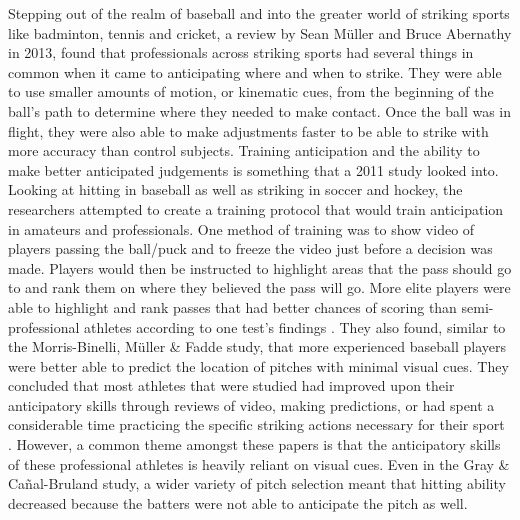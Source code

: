 \documentclass{article}
\begin{document}
\begin{doublespace}
Stepping out of the realm of baseball and into the greater world of striking sports like badminton, tennis and cricket, a review by Sean Müller and Bruce Abernathy in 2013, found that professionals across striking sports had several things in common when it came to anticipating where and when to strike. They were able to use smaller amounts of motion, or kinematic cues, from the beginning of the ball’s path to determine where they needed to make contact. Once the ball was in flight, they were also able to make adjustments faster to be able to strike with more accuracy than control subjects\citep{Muller}. Training anticipation and the ability to make better anticipated judgements is something that a 2011 study looked into. Looking at hitting in baseball as well as striking in soccer and hockey, the researchers attempted to create a training protocol that would train anticipation in amateurs and professionals. One method of training was to show video of players passing the ball/puck and to freeze the video just before a decision was made. Players would then be instructed to highlight areas that the pass should go to and rank them on where they believed the pass will go. More elite players were able to highlight and rank passes that had better chances of scoring than semi-professional athletes according to one test’s findings \citep{Williams}. They also found, similar to the Morris-Binelli, Müller & Fadde study\citep{Morris}, that more experienced baseball players were better able to predict the location of pitches with minimal visual cues. They concluded that most athletes that were studied had improved upon their anticipatory skills through reviews of video, making predictions, or had spent a considerable time practicing the specific striking actions necessary for their sport \citep{Williams}. However, a common theme amongst these papers is that the anticipatory skills of these professional athletes is heavily reliant on visual cues. Even in the Gray & Cañal-Bruland study\citep{Gray}, a wider variety of pitch selection meant that hitting ability decreased because the batters were not able to anticipate the pitch as well. 

\end{doublespace}
\end{document}
